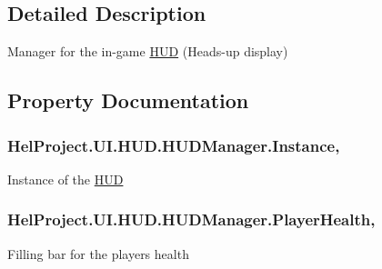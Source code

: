 \subsection{Detailed Description}
Manager for the in-\/game \hyperlink{namespace_hel_project_1_1_u_i_1_1_h_u_d}{H\+U\+D} (Heads-\/up display) 



\subsection{Property Documentation}
\hypertarget{class_hel_project_1_1_u_i_1_1_h_u_d_1_1_h_u_d_manager_ae6812a87fea78cc46470b329f9eb981d}{}
\subsubsection[{Instance}]{ Hel\+Project.\+U\+I.\+H\+U\+D.\+H\+U\+D\+Manager.\+Instance\hspace{0.3cm}{\ttfamily [static]}, {\ttfamily [get]}}\label{class_hel_project_1_1_u_i_1_1_h_u_d_1_1_h_u_d_manager_ae6812a87fea78cc46470b329f9eb981d}


Instance of the \hyperlink{namespace_hel_project_1_1_u_i_1_1_h_u_d}{H\+U\+D} 

\hypertarget{class_hel_project_1_1_u_i_1_1_h_u_d_1_1_h_u_d_manager_ab347bc0ee8f76e51967bfe44e304e833}{}
\subsubsection[{Player\+Health}]{ Hel\+Project.\+U\+I.\+H\+U\+D.\+H\+U\+D\+Manager.\+Player\+Health\hspace{0.3cm}{\ttfamily [get]}, {\ttfamily [set]}}\label{class_hel_project_1_1_u_i_1_1_h_u_d_1_1_h_u_d_manager_ab347bc0ee8f76e51967bfe44e304e833}


Filling bar for the player\textquotesingle{}s health 

